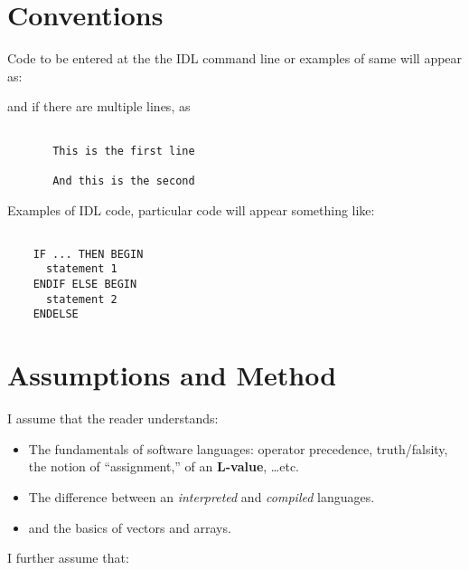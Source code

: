 \section{Conventions}\label{sec:Conventions}

    Code to be entered at the the IDL command line or examples of same will
    appear as:

    
    and if there are multiple lines, as

    \begin{IDLExample}
      \begin{verbatim}

       This is the first line

       And this is the second

      \end{verbatim}
    \end{IDLExample}
        

    Examples of IDL code, particular  code will appear
    something like:


    \begin{IDLExample}
\begin{verbatim}

    IF ... THEN BEGIN
      statement 1
    ENDIF ELSE BEGIN
      statement 2
    ENDELSE

     \end{verbatim}
 \end{IDLExample}

\section{Assumptions and Method}\label{sec:Assumptions}

    I assume that the reader understands:
    \begin{itemize}
        \item The fundamentals of software languages: operator
         precedence, truth/falsity, the notion of ``assignment,'' 
         of an \textbf{L-value}, \ldots etc.

        \item The difference between an \textit{interpreted} and
              \textit{compiled} languages.
         \item and the basics of vectors and arrays.
    \end{itemize}

   I further assume that:

